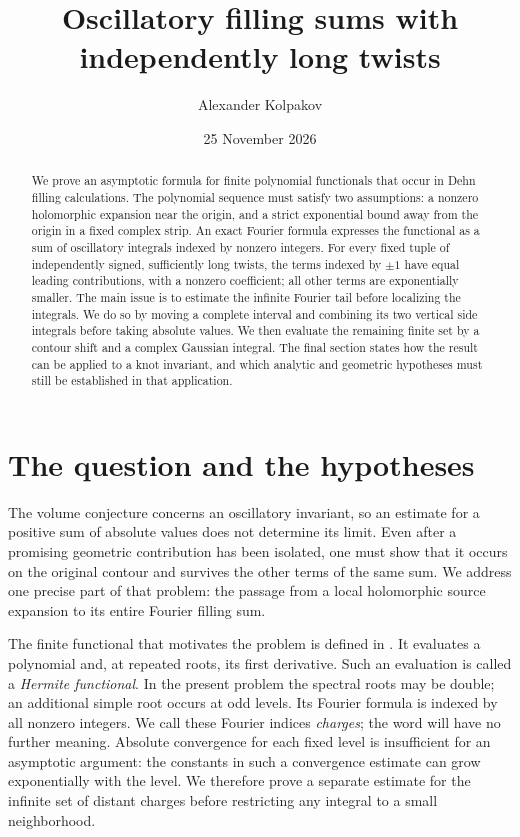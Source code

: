 \documentclass[11pt]{article}
\title{Oscillatory filling sums with independently long twists}
\author{Alexander Kolpakov}
\date{25 November 2026}
\numberwithin{equation}{section}
\theoremstyle{definition}\newtheorem{definition}[theorem]{Definition}
\theoremstyle{remark}\newtheorem{remark}[theorem]{Remark}
\begin{document}
\maketitle
\begin{abstract}
We prove an asymptotic formula for finite polynomial functionals that
occur in Dehn filling calculations. The polynomial sequence must satisfy
two assumptions: a nonzero holomorphic expansion near the origin, and
a strict exponential bound away from the origin in a fixed complex
strip. An exact Fourier formula expresses the functional as a sum of
oscillatory integrals indexed by nonzero integers. For every fixed tuple
of independently signed, sufficiently long twists, the terms indexed
by $\pm1$ have equal leading contributions, with a nonzero coefficient;
all other terms are exponentially smaller. The main issue is to estimate
the infinite Fourier tail before localizing the integrals. We do so by
moving a complete interval and combining its two vertical side integrals
before taking absolute values. We then evaluate the remaining finite
set by a contour shift and a complex Gaussian integral. The final
section states how the result can be applied to a knot invariant, and
which analytic and geometric hypotheses must still be established in
that application.
\end{abstract}

\section{The question and the hypotheses}

The volume conjecture concerns an oscillatory invariant, so an estimate
for a positive sum of absolute values does not determine its limit. Even
after a promising geometric contribution has been isolated, one must
show that it occurs on the original contour and survives the other terms
of the same sum. We address one precise part of that problem: the passage
from a local holomorphic source expansion to its entire Fourier filling
sum.

The finite functional that motivates the problem is defined in
\cite{FinitePaper}. It evaluates a polynomial and, at repeated roots,
its first derivative. Such an evaluation is called a \emph{Hermite
functional}. In the present problem the spectral roots may be double;
an additional simple root occurs at odd levels. Its Fourier formula
is indexed by all nonzero integers. We call these Fourier indices
\emph{charges}; the word will have no further meaning. Absolute
convergence for each fixed level is insufficient for an asymptotic
argument: the constants in such a convergence estimate can grow
exponentially with the level. We therefore prove a separate estimate
for the infinite set of distant charges before restricting any integral
to a small neighborhood.
\end{document}
